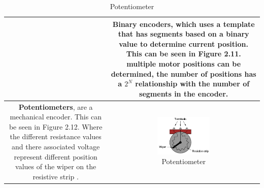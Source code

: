 \begin{table}[H]
\begin{tabular}{|c|c|}
\begin{minipage}[b]{0.45\textwidth}
      \end{minipage}
         &  
        \begin{minipage}[b]{0.49\textwidth}
        \vspace{2mm}
              \textbf{Binary encoders}, which uses a template that has segments based on a binary value to determine current position. This can be seen in Figure 2.11. multiple motor positions can be determined, the number of positions has a $2^N$ relationship with the number of segments in the encoder. 
              \vspace{2mm}
        \end{minipage}\\
         \hline
          \begin{minipage}[b]{0.49\textwidth}         
            \textbf{Potentiometers}, are a mechanical encoder. This can be seen in Figure 2.12. Where the different resistance values and there associated voltage represent different position values of the wiper on the resistive strip \cite{rotarypot}.
        \end{minipage}
         &
          \begin{minipage}[b]{0.49\textwidth}
          \centering
              \begin{figure}[H]
              \centering
                 \includegraphics[width=0.5\textwidth]{Rotarypot.png}
                    \caption{Potentiometer}
                    \label{fig:pot}
              \end{figure}


\end{minipage}
\end{tabular}
\end{table}
